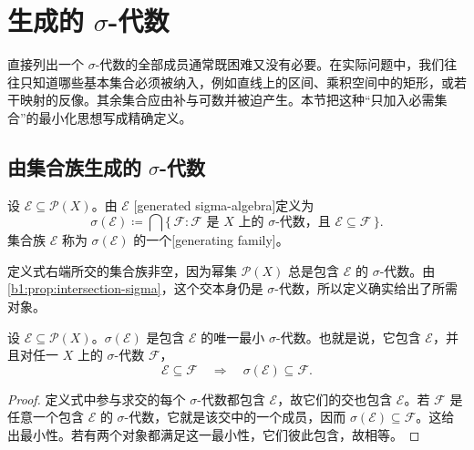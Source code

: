 \section{生成的 \texorpdfstring{\(\sigma\)}{\AnalysisPdfSigma}-代数}
\label{b1:sec:0102}

直接列出一个 \(\sigma\)-代数的全部成员通常既困难又没有必要。在实际问题中，我们往往只知道哪些基本集合必须被纳入，例如直线上的区间、乘积空间中的矩形，或若干映射的反像。其余集合应由补与可数并被迫产生。本节把这种“只加入必需集合”的最小化思想写成精确定义。

\subsection{由集合族生成的 \texorpdfstring{\(\sigma\)}{\AnalysisPdfSigma}-代数}
\label{b1:subsec:010201}

\begin{definition}
\label{b1:def:generated-sigma}
设 \(\mathcal E\subseteq\mathcal P(X)\)。由 \(\mathcal E\) [generated sigma-algebra]定义为
\[
\sigma(\mathcal E)
\coloneqq\bigcap\{\,\mathcal F:\mathcal F\text{ 是 }X\text{ 上的 \(\sigma\)-代数，且 }\mathcal E\subseteq\mathcal F\,\}.
\]
集合族 \(\mathcal E\) 称为 \(\sigma(\mathcal E)\) 的一个[generating family]。
\end{definition}

定义式右端所交的集合族非空，因为幂集 \(\mathcal P(X)\) 总是包含 \(\mathcal E\) 的 \(\sigma\)-代数。由\cref{b1:prop:intersection-sigma}，这个交本身仍是 \(\sigma\)-代数，所以定义确实给出了所需对象。

\begin{proposition}
\label{b1:prop:generated-minimal}
设 \(\mathcal E\subseteq\mathcal P(X)\)。\(\sigma(\mathcal E)\) 是包含 \(\mathcal E\) 的唯一最小 \(\sigma\)-代数。也就是说，它包含 \(\mathcal E\)，并且对任一 \(X\) 上的 \(\sigma\)-代数 \(\mathcal F\)，
\[
\mathcal E\subseteq\mathcal F
\quad\Longrightarrow\quad
\sigma(\mathcal E)\subseteq\mathcal F.
\]
\end{proposition}
\begin{proof}
定义式中参与求交的每个 \(\sigma\)-代数都包含 \(\mathcal E\)，故它们的交也包含 \(\mathcal E\)。若 \(\mathcal F\) 是任意一个包含 \(\mathcal E\) 的 \(\sigma\)-代数，它就是该交中的一个成员，因而
\(
\sigma(\mathcal E)\subseteq\mathcal F
\)。这给出最小性。若有两个对象都满足这一最小性，它们彼此包含，故相等。
\end{proof}


